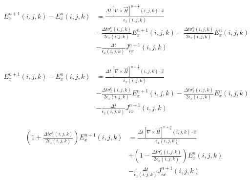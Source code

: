 \documentclass[10pt]{article}
\begin{document}
\begin{equation}
	\begin{aligned}
		E^{n+1}_{x}(i,j,k) - E^{n}_{x}(i,j,k) & =
		\frac{\Delta t \left[ \nabla \times \vec{H} \right]^{n+\frac{1}{2}}(i,j,k) \cdot \hat{x}}{\epsilon_{{x}}(i,j,k)}                                                                                        \\
		                                      & - \frac{\Delta t\sigma^{e}_{x}(i,j,k)}{2\epsilon_{x}(i,j,k)}  E^{n+1}_{x}(i,j,k)- \frac{\Delta t\sigma^{e}_{x}(i,j,k)}{2\epsilon_{x}(i,j,k)}   E^{n}_{x}(i,j,k) \\
		                                      & - \frac{\Delta t}{\epsilon_{x}(i,j,k)} J^{n+1}_{ix}(i,j,k)
	\end{aligned}
\end{equation}

\begin{equation}
	\begin{aligned}
		E^{n+1}_{x}(i,j,k) - E^{n}_{x}(i,j,k) & =
		\frac{\Delta t \left[ \nabla \times \vec{H} \right]^{n+\frac{1}{2}}(i,j,k) \cdot \hat{x}}{\epsilon_{{x}}(i,j,k)}                                                                                          \\
		                                      & - \frac{\Delta t \sigma^{e}_{x}(i,j,k)}{2\epsilon_{x}(i,j,k)}  E^{n+1}_{x}(i,j,k)- \frac{\Delta t \sigma^{e}_{x}(i,j,k)}{2\epsilon_{x}(i,j,k)}   E^{n}_{x}(i,j,k) \\
		                                      & - \frac{\Delta t}{\epsilon_{x}(i,j,k)} J^{n+1}_{ix}(i,j,k)
	\end{aligned}
\end{equation}

\begin{equation}
	\begin{aligned}
		\left(1 + \frac{\Delta t \sigma^{e}_{x}(i,j,k)}{2\epsilon_{x}(i,j,k)} \right) E^{n+1}_{x}(i,j,k) & =
		\frac{\Delta t \left[ \nabla \times \vec{H} \right]^{n+\frac{1}{2}}(i,j,k) \cdot \hat{x}}{\epsilon_{{x}}(i,j,k)}                                                                                       \\
		                                                                                                 & + \left( 1 - \frac{\Delta t \sigma^{e}_{x}(i,j,k)}{2\epsilon_{x}(i,j,k)} \right)   E^{n}_{x}(i,j,k) \\
		                                                                                                 & - \frac{\Delta t}{\epsilon_{x}(i,j,k)} J^{n+1}_{ix}(i,j,k)
	\end{aligned}
\end{equation}
\end{document}
